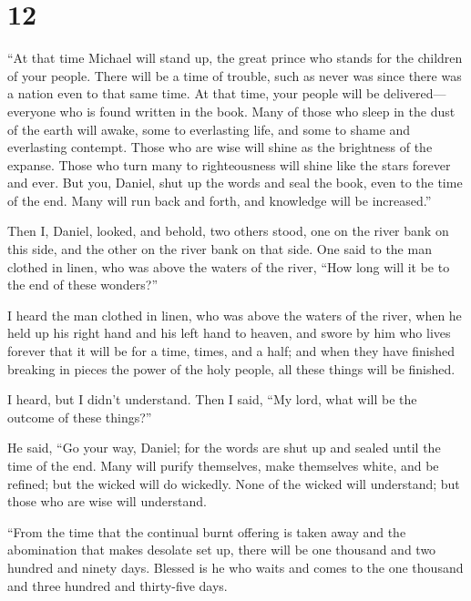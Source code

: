 \hypertarget{section-11}{%
\section{12}\label{section-11}}

 ``At that time Michael will stand up, the great prince who
stands for the children of your people. There will be a time of trouble,
such as never was since there was a nation even to that same time. At
that time, your people will be delivered---everyone who is found written
in the book.  Many of those who sleep in the dust of the
earth will awake, some to everlasting life, and some to shame and
everlasting contempt.  Those who are wise will shine as the
brightness of the expanse. Those who turn many to righteousness will
shine like the stars forever and ever.  But you, Daniel,
shut up the words and seal the book, even to the time of the end. Many
will run back and forth, and knowledge will be increased.''

 Then I, Daniel, looked, and behold, two others stood, one
on the river bank on this side, and the other on the river bank on that
side.  One said to the man clothed in linen, who was above
the waters of the river, ``How long will it be to the end of these
wonders?''

 I heard the man clothed in linen, who was above the waters
of the river, when he held up his right hand and his left hand to
heaven, and swore by him who lives forever that it will be for a time,
times, and a half; and when they have finished breaking in pieces the
power of the holy people, all these things will be finished.

 I heard, but I didn't understand. Then I said, ``My lord,
what will be the outcome of these things?''

 He said, ``Go your way, Daniel; for the words are shut up
and sealed until the time of the end.  Many will purify
themselves, make themselves white, and be refined; but the wicked will
do wickedly. None of the wicked will understand; but those who are wise
will understand.

 ``From the time that the continual burnt offering is taken
away and the abomination that makes desolate set up, there will be one
thousand and two hundred and ninety days.  Blessed is he
who waits and comes to the one thousand and three hundred and
thirty-five days.

